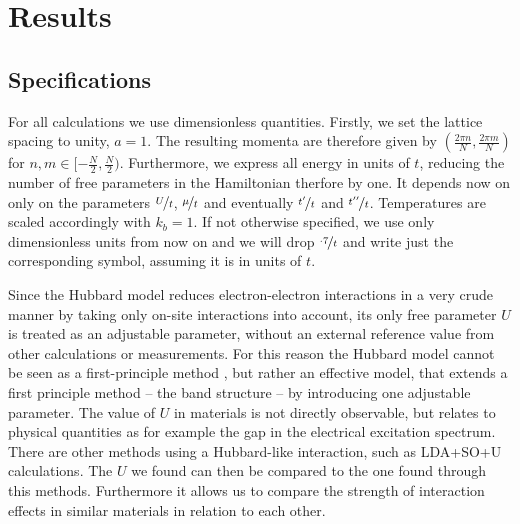 \documentclass[a4paper,12pt]{report}
\begin{document}
\chapter{Results}

\section{Specifications} %

For all calculations we use dimensionless quantities. 
Firstly, we set the lattice spacing to unity, $a=1$. 
The resulting momenta are therefore given by $(\frac{2\pi n}{N},\frac{2\pi m}{N})$ for $n,m \in [-\frac N2, \frac N2)$.
Furthermore, we express all energy in units of $t$, reducing the number of free parameters in the Hamiltonian therfore by one.
It depends now on only on the parameters $\nicefrac Ut$, $\nicefrac {\mu}t$ and eventually $\nicefrac{t^{\prime}}t$ and $\nicefrac{t^{\prime \prime}}t$.
Temperatures are scaled accordingly with $k_b=1$.
If not otherwise specified, we use only dimensionless units from now on and we will drop $\nicefrac{\cdot7}{t}$ and write just the corresponding symbol, 
assuming it is in units of $t$.


Since the Hubbard model reduces electron-electron interactions in a very crude manner by taking only on-site interactions into account,
its only free parameter $U$ is treated as an adjustable parameter, without an external reference value from other calculations or measurements.	
For this reason the Hubbard model cannot be seen as a first-principle method \cite{J.Phys.Cond.Matter.Vol21.34},
but rather an effective model, that extends a first principle method – the band structure – by introducing one adjustable parameter.
The value of $U$ in materials is not directly observable, but relates to physical quantities as for example the gap in the electrical excitation spectrum.
There are other methods using a Hubbard-like interaction, such as LDA+SO+U calculations.
The $U$ we found can then be compared to the one found through this methods. 
Furthermore it allows us to compare the strength of interaction effects in similar materials in relation to each other.
\end{document}
